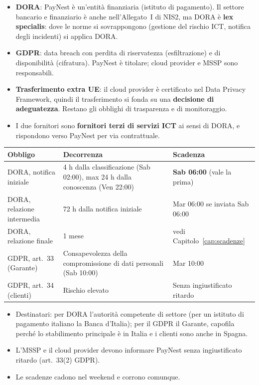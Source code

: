 \begin{soluzione}
\begin{itemize}
  \item \textbf{DORA}: PayNest è un'entità finanziaria (istituto di pagamento). Il settore bancario e
    finanziario è anche nell'Allegato~I di NIS2, ma DORA è \textbf{lex specialis}: dove le norme si
    sovrappongono (gestione del rischio ICT, notifica degli incidenti) si applica DORA.
  \item \textbf{GDPR}: data breach con perdita di riservatezza (esfiltrazione) e di disponibilità
    (cifratura). PayNest è titolare; cloud provider e MSSP sono responsabili.
  \item \textbf{Trasferimento extra UE}: il cloud provider è certificato nel Data Privacy Framework,
    quindi il trasferimento si fonda su una \textbf{decisione di adeguatezza}. Restano gli obblighi di
    trasparenza e di monitoraggio.
  \item I due fornitori sono \textbf{fornitori terzi di servizi ICT} ai sensi di DORA, e rispondono
    verso PayNest per via contrattuale.
\end{itemize}
\end{soluzione}

\begin{soluzione}
\begin{center}
\small
\begin{tabularx}{\linewidth}{l X l}
\toprule
\textbf{Obbligo} & \textbf{Decorrenza} & \textbf{Scadenza} \\ \midrule
DORA, notifica iniziale  & 4 h dalla classificazione (Sab 02:00), max 24 h dalla conoscenza (Ven 22:00)
  & \textbf{Sab 06:00} (vale la prima) \\
DORA, relazione intermedia & 72 h dalla notifica iniziale & Mar 06:00 se inviata Sab 06:00 \\
DORA, relazione finale & 1 mese & vedi Capitolo~\ref{cap:scadenze} \\
GDPR, art.~33 (Garante) & Consapevolezza della compromissione di dati personali (Sab 10:00) & Mar 10:00 \\
GDPR, art.~34 (clienti) & Rischio elevato & Senza ingiustificato ritardo \\ \bottomrule
\end{tabularx}
\end{center}
\begin{itemize}
  \item Destinatari: per DORA l'autorità competente di settore (per un istituto di pagamento italiano
    la Banca d'Italia); per il GDPR il Garante, capofila perché lo stabilimento principale è in Italia
    e i clienti sono anche in Spagna.
  \item L'MSSP e il cloud provider devono informare PayNest senza ingiustificato ritardo (art.~33(2) GDPR).
  \item Le scadenze cadono nel weekend e corrono comunque.
\end{itemize}
\end{soluzione}

